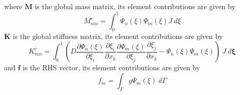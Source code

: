 \documentclass[11pt, a4paper]{article}
\newcommand{\Psim}{\ensuremath{\Psi_m(\xi)}}
\newcommand{\Psin}{\ensuremath{\Psi_n(\xi)}}
\begin{document}
  where $\mathbf{M}$ is the global mass matrix, its element contributions are 
  given by
  \begin{equation}
  M_{mn}^e = \int_{0}^{1}\Psin \Psim J \: d\xi
  \end{equation}
  $\mathbf{K}$ is the global stiffness matrix, its element contributions are 
  given by
  \begin{equation}
  K_{mn}^e = \int_{0}^{1} \left(D \frac{\partial \Psin}{\partial \xi_i} 
  \frac{\partial \xi_i}{\partial x_k} \frac{\partial \Psim}{\partial \xi_j} 
  \frac{\partial \xi_j}{\partial x_k} -\Psin \Psim \right)\: J \: d\bm{\xi}
  \end{equation}
  and $\mathbf{f}$ is the RHS vector, its element contributions are given by
  \begin{equation}
  f_m = \int_{\Gamma} g \Psim \: d\Gamma
  \end{equation}
\end{document}
